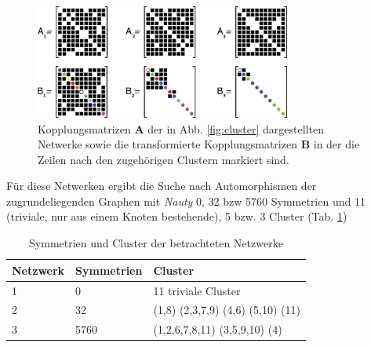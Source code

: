 \begin{figure}
	\centering
	\includegraphics[width=0.75\textwidth]{abb/misc/ABMat.png}
	\caption{Kopplungsmatrizen $\boldsymbol{A}$ der in Abb. \ref{fig:cluster} dargestellten Netwerke sowie die transformierte Kopplungsmatrizen $\boldsymbol{B}$ in der die Zeilen nach den zugehörigen Clustern markiert sind\cite{pecora2014}.}
\label{fig:abmat}
\end{figure}

Für diese Netwerken ergibt die Suche nach Automorphismen der zugrundeliegenden Graphen mit \textit{Nauty} 0, 32 bzw 5760 Symmetrien und 11 (triviale, nur aus einem Knoten bestehende), 5 bzw. 3 Cluster (Tab. \ref{tab:netzwerke})

\begin{table}[]
	\begin{center}
	\caption{Symmetrien und Cluster der betrachteten Netzwerke}
	\label{tab:netzwerke}
\begin{tabular}{lll}
	Netzwerk & Symmetrien & Cluster                           \\
	\hline
	1        & 0          & 11 triviale Cluster               \\
	2        & 32         & (1,8) (2,3,7,9) (4,6) (5,10) (11) \\
	3        & 5760       & (1,2,6,7,8,11) (3,5,9,10) (4) \\  
	\hline
\end{tabular}
	\end{center}
\end{table}

